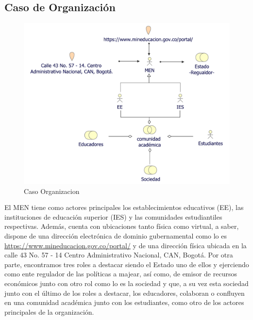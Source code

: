 \newpage
\subsection{Caso  de Organización}
\begin{figure}[h!]
	\centering
	\includegraphics[width=.9\linewidth]{imgs/caso/negocio/organizacion}
	\caption{Caso Organizacion}
\end{figure}

El MEN tiene como actores principales los establecimientos educativos (EE), las instituciones de educación superior (IES) y las comunidades estudiantiles respectivas. Además, cuenta con ubicaciones tanto física como virtual, a saber, dispone de una dirección electrónica de dominio gubernamental como lo es \url{https://www.mineducacion.gov.co/portal/} y de una dirección física ubicada en la calle 43 No. 57 - 14 Centro 
Administrativo Nacional, CAN, Bogotá. Por otra parte, encontramos tres roles a destacar siendo el Estado uno de ellos y ejerciendo como ente regulador de las políticas a majear, así como, de emisor de recursos económicos junto con otro rol como lo es la sociedad y que, a su vez esta sociedad junto con el último de los roles a destacar, los educadores, colaboran o confluyen en una comunidad académica junto con los estudiantes, como otro de los actores principales de la organización.

